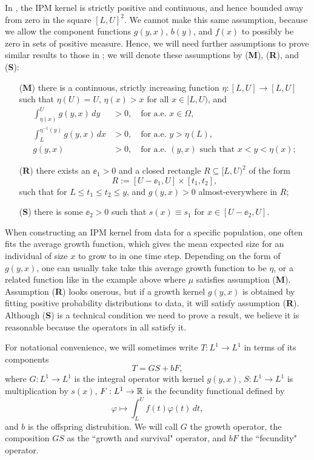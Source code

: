 In \cite{Ellner2006}, the IPM kernel is strictly positive and continuous, and hence bounded away from zero in the square $[L, U]^2$. We cannot make this same assumption, because we allow the component functions $g(y,x)$, $b(y)$, and $f(x)$ to possibly be zero in sets of positive measure. Hence, we will need further assumptions to prove similar results to those in \cite{Ellner2006}; we will denote these assumptions by (\textbf{M}), (\textbf{R}), and (\textbf{S}):

\begin{enumerate}
	\item[(\textbf{M})] there is a continuous, strictly increasing function $\eta:[L,U] \to [L,U]$ such that $\eta(U)=U$, $\eta(x)>x$ for all $x \in [L,U)$, and
	\begin{align}
		\int_{\eta(x)}^U g(y,x) \, dy &> 0, \quad \text{for a.e. } x \in \Omega, \label{eqn:M1}\\
		\int_L^{\eta^{-1}(y)} g(y,x) \,dx &> 0, \quad \text{for a.e. } y > \eta(L), \label{eqn:M2}\\
		g(y, x) &> 0, \quad \text{for a.e. } (y, x) \text{ such that } x < y < \eta(x); \label{eqn:M3}
	\end{align}
	\item[(\textbf{R})] there exists an $\ee_1 > 0$ and a closed rectangle $R \subseteq [L, U)^2$ of the form
	\[R := [U - \ee_1, U] \times [t_1, t_2],\]
	such that for  $L \leq t_1 \leq t_2 \leq y$, and $g(y, x) > 0$ almost-everywhere in $R$;
	\item[(\textbf{S})]  there is some $\ee_2 > 0$ such that $s(x) \equiv s_1$ for $x \in [U - \ee_2, U]$.
\end{enumerate} 
When constructing an IPM kernel from data for a specific population, one often fits the average growth function, which gives the mean expected size for an individual of size $x$ to grow to in one time step. Depending on the form of $g(y, x)$, one can usually take take this average growth function to be $\eta$, or a related function like in the example above where $\mu$ satisfies assumption (\textbf{M}). Assumption (\textbf{R}) looks onerous, but if a growth kernel $g(y, x)$ is obtained by fitting positive probability distributions to data, it will satisfy assumption (\textbf{R}). Although (\textbf{S}) is a technical condition we need to prove a result, we believe it is reasonable because the operators in \cite{Ohlberger2020, Stubberud2019, Vindenes2014, Vindenes2015} all satisfy it.

For notational convenience, we will sometimes write $T:L^1 \to L^1$ in terms of its components
\[T = GS + bF,\]
where $G:L^1 \to L^1$ is the integral operator with kernel $g(y,x)$, $S:L^1 \to L^1$ is multiplication by $s(x)$, $F:L^1 \to \mathbb{R}$ is the fecundity functional defined by
\[\varphi \mapsto \int_L^U f(t) \varphi(t) \, dt,\]
and $b$ is the offspring distrubition. We will call $G$ the growth operator, the composition $GS$ as the ``growth and survival" operator, and $bF$ the ``fecundity" operator.

